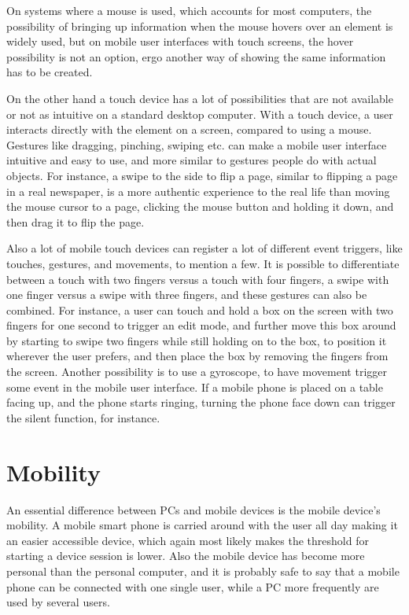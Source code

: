 On systems where a mouse is used, which accounts for most computers, the possibility of bringing up information when the mouse hovers over an element is widely used, but on mobile user interfaces with touch screens, the hover possibility is not an option, ergo another way of showing the same information has to be created.

On the other hand a touch device has a lot of possibilities that are not available or not as intuitive on a standard desktop computer. With a touch device, a user interacts directly with the element on a screen, compared to using a mouse. Gestures like dragging, pinching, swiping etc. can make a mobile user interface intuitive and easy to use, and more similar to gestures people do with actual objects. For instance, a swipe to the side to flip a page, similar to flipping a page in a real newspaper, is a more authentic experience to the real life than moving the mouse cursor to a page, clicking the mouse button and holding it down, and then drag it to flip the page.

Also a lot of mobile touch devices can register a lot of different event triggers, like touches, gestures, and movements, to mention a few. It is possible to differentiate between a touch with two fingers versus a touch with four fingers, a swipe with one finger versus a swipe with three fingers, and these gestures can also be combined. For instance, a user can touch and hold a box on the screen with two fingers for one second to trigger an edit mode, and further move this box around by starting to swipe two fingers while still holding on to the box, to position it wherever the user prefers, and then place the box by removing the fingers from the screen. Another possibility is to use a gyroscope, to have movement trigger some event in the mobile user interface. If a mobile phone is placed on a table facing up, and the phone starts ringing, turning the phone face down can trigger the silent function, for instance.

\section{Mobility}
An essential difference between PCs and mobile devices is the mobile device's mobility. A mobile smart phone is carried around with the user all day making it an easier accessible device, which again most likely makes the threshold for starting a device session is lower. Also the mobile device has become more personal than the personal computer, and it is probably safe to say that a mobile phone can be connected with one single user, while a PC more frequently are used by several users.


